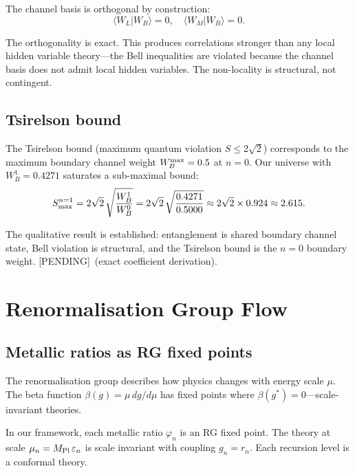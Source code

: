 \documentclass[prd,twocolumn,preprintnumbers,amsmath,amssymb]{revtex4-2}
\newcommand{\pending}{\textcolor{red!70!black}{[PENDING]}}
\begin{document}
The channel basis is orthogonal by construction:
\begin{equation}
  \langle W_L | W_B \rangle = 0, \quad
  \langle W_M | W_B \rangle = 0.
  \label{eq:orthog}
\end{equation}

The orthogonality is exact.  This produces correlations stronger than
any local hidden variable theory---the Bell inequalities are violated
because the channel basis does not admit local hidden variables.
The non-locality is structural, not contingent.

\subsection{Tsirelson bound}

The Tsirelson bound (maximum quantum violation $S \leq 2\sqrt{2}$)
corresponds to the maximum boundary channel weight
$W_B^{\rm max} = 0.5$ at $n=0$.  Our universe with $W_B^1 = 0.4271$
saturates a sub-maximal bound:
\begin{equation}
  S_{\rm max}^{n=1} = 2\sqrt{2}\,\sqrt{\frac{W_B^1}{W_B^0}}
    = 2\sqrt{2}\,\sqrt{\frac{0.4271}{0.5000}}
    \approx 2\sqrt{2} \times 0.924
    \approx 2.615.
  \label{eq:Tsirelson}
\end{equation}

The qualitative result is established: entanglement is shared
boundary channel state, Bell violation is structural, and the
Tsirelson bound is the $n=0$ boundary weight.  \pending\ (exact
coefficient derivation).

\section{Renormalisation Group Flow}
\label{sec:rg}

\subsection{Metallic ratios as RG fixed points}

The renormalisation group describes how physics changes with energy
scale $\mu$.  The beta function $\beta(g) = \mu\,dg/d\mu$ has fixed
points where $\beta(g^*) = 0$---scale-invariant theories.

In our framework, each metallic ratio $\varphi_n$ is an RG fixed
point.  The theory at scale $\mu_n = M_{\rm Pl}\,\varepsilon_n$ is
scale invariant with coupling $g_n = r_n$.  Each recursion level is
a conformal theory.
\end{document}
